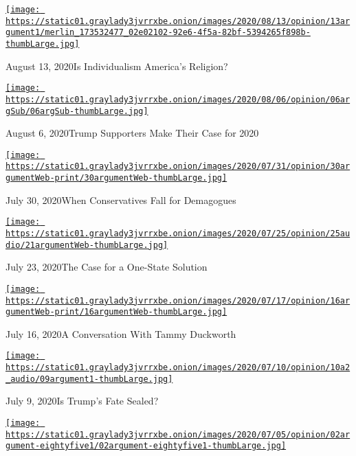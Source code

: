 \href{https://www.nytimes3xbfgragh.onion/2020/08/13/opinion/the-argument-coronavirus-catholic-covid.html?action=click\&module=audio-series-bar\&region=header\&pgtype=Article}{\texttt{[image: https://static01.graylady3jvrrxbe.onion/images/2020/08/13/opinion/13argument1/merlin\_173532477\_02e02102-92e6-4f5a-82bf-5394265f898b-thumbLarge.jpg]}}

August 13, 2020Is Individualism America's Religion?

\href{https://www.nytimes3xbfgragh.onion/2020/08/06/opinion/the-argument-trump-coronavirus-election.html?action=click\&module=audio-series-bar\&region=header\&pgtype=Article}{\texttt{[image: https://static01.graylady3jvrrxbe.onion/images/2020/08/06/opinion/06argSub/06argSub-thumbLarge.jpg]}}

August 6, 2020Trump Supporters Make Their Case for 2020

\href{https://www.nytimes3xbfgragh.onion/2020/07/30/opinion/the-argument-authoritarianism-anne-applebaum.html?action=click\&module=audio-series-bar\&region=header\&pgtype=Article}{\texttt{[image: https://static01.graylady3jvrrxbe.onion/images/2020/07/31/opinion/30argumentWeb-print/30argumentWeb-thumbLarge.jpg]}}

July 30, 2020When Conservatives Fall for Demagogues

\href{https://www.nytimes3xbfgragh.onion/2020/07/23/opinion/the-argument-israel-palestinian.html?action=click\&module=audio-series-bar\&region=header\&pgtype=Article}{\texttt{[image: https://static01.graylady3jvrrxbe.onion/images/2020/07/25/opinion/25audio/21argumentWeb-thumbLarge.jpg]}}

July 23, 2020The Case for a One-State Solution

\href{https://www.nytimes3xbfgragh.onion/2020/07/16/opinion/the-argument-tammy-duckworth.html?action=click\&module=audio-series-bar\&region=header\&pgtype=Article}{\texttt{[image: https://static01.graylady3jvrrxbe.onion/images/2020/07/17/opinion/16argumentWeb-print/16argumentWeb-thumbLarge.jpg]}}

July 16, 2020A Conversation With Tammy Duckworth

\href{https://www.nytimes3xbfgragh.onion/2020/07/09/opinion/is-trumps-fate-sealed.html?action=click\&module=audio-series-bar\&region=header\&pgtype=Article}{\texttt{[image: https://static01.graylady3jvrrxbe.onion/images/2020/07/10/opinion/10a2\_audio/09argument1-thumbLarge.jpg]}}

July 9, 2020Is Trump's Fate Sealed?

\href{https://www.nytimes3xbfgragh.onion/2020/07/02/opinion/the-argument-protest-statue-revolution.html?action=click\&module=audio-series-bar\&region=header\&pgtype=Article}{\texttt{[image: https://static01.graylady3jvrrxbe.onion/images/2020/07/05/opinion/02argument-eightyfive1/02argument-eightyfive1-thumbLarge.jpg]}}

